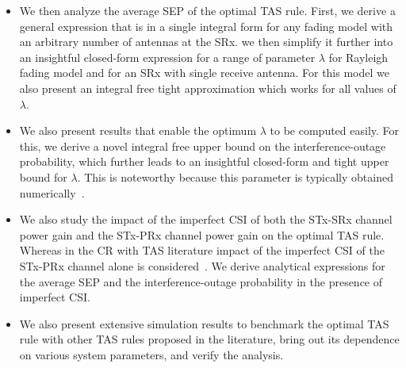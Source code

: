 \documentclass[12pt,draftcls,peerreview,onecolumn]{IEEEtran}
\newcommand{\lam}{\lambda}
\newcommand{\Nt}{{N_t}}
\begin{document}
\begin{itemize}
%
\item We then analyze the average SEP of the optimal TAS rule. First, we derive a general expression that is in a single integral form for any fading model with an arbitrary number of antennas at the SRx. we then  simplify it further into an insightful closed-form expression for a range of parameter $\lam$ for Rayleigh fading model and for an SRx with single receive antenna. For this model we also present an integral free tight approximation which works for all values of $\lam$. 
% 
\item We also present results that enable the optimum $\lam$ to be computed easily. For this, we derive a novel integral free upper bound on the interference-outage probability, which further leads to an insightful closed-form and tight upper bound for $\lam$. This is noteworthy because this parameter is typically obtained numerically~\cite{Sarvendranath_2013_TCOM,Wang_2011_TCom}. 
% 
%

\item We also study the impact of the imperfect CSI of both the STx-SRx channel power gain and the STx-PRx channel power gain on the optimal TAS rule. Whereas in the CR with TAS literature impact of the imperfect CSI of the STx-PRx channel alone is considered~\cite{musavian_2009_tcom,Suraweera_2010_TVT,Peng_2016_eurasip,Li_2011_commLet}. We derive analytical expressions for the average SEP and the interference-outage probability in the presence of imperfect CSI.

\item We also present extensive simulation results to benchmark the optimal TAS rule with other TAS rules proposed in the literature, bring out its dependence on various system parameters, and verify the analysis.

\end{itemize}
\end{document}
